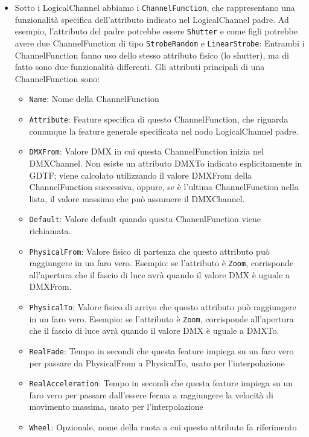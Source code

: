 \documentclass[main.tex]{subfiles}
\begin{document}
\begin{itemize}
\begin{itemize}
        \end{itemize}
    \item Sotto i LogicalChannel abbiamo i \lstinline{ChannelFunction}, che rappresentano una funzionalità specifica dell'attributo indicato nel LogicalChannel padre. Ad esempio, l'attributo del padre potrebbe essere \lstinline{Shutter} e come figli potrebbe avere due ChannelFunction di tipo \lstinline{StrobeRandom} e \lstinline{LinearStrobe}: Entrambi i ChannelFunction fanno uso dello stesso attributo fisico (lo shutter), ma di fatto sono due funzionalità differenti. Gli attributi principali di una ChannelFunction sono: \begin{itemize}
            \item \lstinline{Name}: Nome della ChannelFunction
            \item \lstinline{Attribute}: Feature specifica di questo ChannelFunction, che riguarda comunque la feature generale specificata nel nodo LogicalChannel padre.
            \item \lstinline{DMXFrom}: Valore DMX in cui questa ChannelFunction inizia nel DMXChannel. Non esiste un attributo DMXTo indicato esplicitamente in GDTF; viene calcolato utilizzando il valore DMXFrom della ChannelFunction successiva, oppure, se è l'ultima ChannelFunction nella lista, il valore massimo che può assumere il DMXChannel.
            \item \lstinline{Default}: Valore default quando questa ChanenlFunction viene richiamata.
            \item \lstinline{PhysicalFrom}: Valore fisico di partenza che questo attributo può raggiungere in un faro vero. Esempio: se l'attributo è \lstinline{Zoom}, corrisponde all'apertura che il fascio di luce avrà quando il valore DMX è uguale a DMXFrom.
            \item \lstinline{PhysicalTo}: Valore fisico di arrivo che questo attributo può raggiungere in un faro vero. Esempio: se l'attributo è \lstinline{Zoom}, corrisponde all'apertura che il fascio di luce avrà quando il valore DMX è uguale a DMXTo.
            \item \lstinline{RealFade}: Tempo in secondi che questa feature impiega su un faro vero per passare da PhysicalFrom a PhysicalTo, usato per l'interpolazione
            \item \lstinline{RealAcceleration}: Tempo in secondi che questa feature impiega su un faro vero per passare dall'essere ferma a raggiungere la velocità di movimento massima, usato per l'interpolazione
            \item \lstinline{Wheel}: Opzionale, nome della ruota a cui questo attributo fa riferimento

\end{itemize}
\end{itemize}
\end{document}
